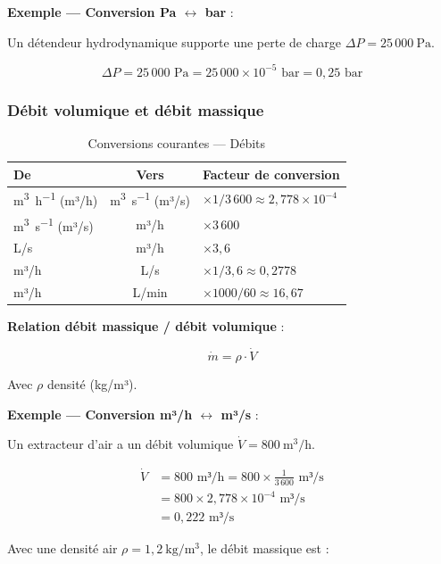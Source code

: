 \textbf{Exemple — Conversion Pa $\leftrightarrow$ bar} :

Un détendeur hydrodynamique supporte une perte de charge $\Delta P = 25\,000~\mathrm{Pa}$.

\[
  \Delta P = 25\,000 \text{ Pa} = 25\,000 \times 10^{-5} \text{ bar} = 0{,}25 \text{ bar}
\]

\subsubsection{Débit volumique et débit massique}

\begin{table}[h]
  \centering
  \sffamily\small
  \caption{Conversions courantes — Débits}
  \label{tab:conv-debit}
  \begin{tabular}{|l|c|l|}
    \hline
    \textbf{De} & \textbf{Vers} & \textbf{Facteur de conversion} \\
    \hline
    \si{\meter\cubed\per\hour} (m³/h) & \si{\meter\cubed\per\second} (m³/s) & $\times 1/3\,600 \approx 2{,}778 \times 10^{-4}$ \\
    \si{\meter\cubed\per\second} (m³/s) & m³/h & $\times 3\,600$ \\
    L/s & m³/h & $\times 3{,}6$ \\
    m³/h & L/s & $\times 1/3{,}6 \approx 0{,}2778$ \\
    m³/h & L/min & $\times 1000/60 \approx 16{,}67$ \\
    \hline
  \end{tabular}
\end{table}

\textbf{Relation débit massique / débit volumique} :

\[
  \dot{m} = \rho \cdot \dot{V}
\]

Avec $\rho$ densité (kg/m³).

\textbf{Exemple — Conversion m³/h $\leftrightarrow$ m³/s} :

Un extracteur d'air a un débit volumique $\dot{V} = 800~\mathrm{m^3/h}$.

\begin{align*}
  \dot{V} &= 800 \text{ m³/h} = 800 \times \frac{1}{3\,600} \text{ m³/s} \\
  &= 800 \times 2{,}778 \times 10^{-4} \text{ m³/s} \\
  &= 0{,}222 \text{ m³/s}
\end{align*}

Avec une densité air $\rho = 1{,}2~\mathrm{kg/m^3}$, le débit massique est :

